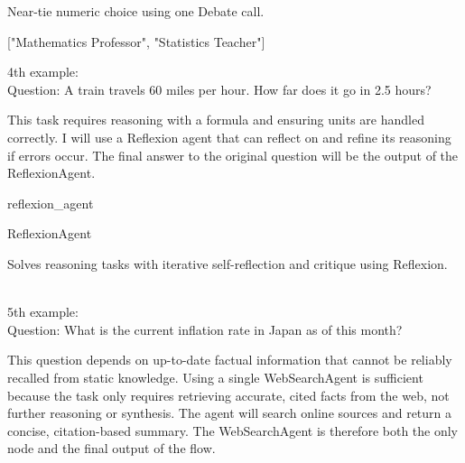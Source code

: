 \begin{userprompt}[title={User Prompt}]
\quad{}
Near-tie numeric choice using one Debate call.

\quad{}

\qquad{}

\qquad{}
["Mathematics Professor", "Statistics Teacher"]

\quad{}


4th example: \\

Question: A train travels 60 miles per hour. How far does it go in 2.5 hours? \\


This task requires reasoning with a formula and ensuring units are handled correctly.
I will use a Reflexion agent that can reflect on and refine its reasoning if errors occur.
The final answer to the original question will be the output of the ReflexionAgent.



\quad{}reflexion\_agent

\quad{}ReflexionAgent

\quad{}
Solves reasoning tasks with iterative self-reflection and critique using Reflexion.

\quad{}

\qquad{}

\quad{}

\\

5th example:\\

Question: What is the current inflation rate in Japan as of this month?\\


This question depends on up-to-date factual information that cannot be reliably recalled from static knowledge.  
Using a single WebSearchAgent is sufficient because the task only requires retrieving accurate, cited facts from the web, not further reasoning or synthesis.  
The agent will search online sources and return a concise, citation-based summary.  
The WebSearchAgent is therefore both the only node and the final output of the flow.


\end{userprompt}
